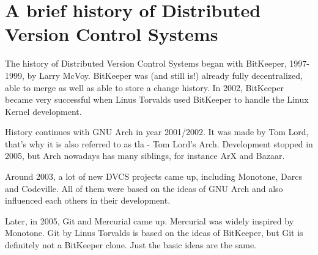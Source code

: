 \section {A brief history of Distributed Version Control Systems}

The history of Distributed Version Control Systems began with BitKeeper, 1997-1999, by Larry McVoy. BitKeeper was (and still is!) already fully decentralized, able to merge as well as able to store a change history. In 2002, BitKeeper became very successful when Linus Torvalds used BitKeeper to handle the Linux Kernel development.

History continues with GNU Arch in year 2001/2002. It was made by Tom Lord, that's why it is also referred to as tla - Tom Lord's Arch. Development stopped in 2005, but Arch nowadays has many siblings, for instance ArX and Bazaar.

Around 2003, a lot of new DVCS projects came up, including Monotone, Darcs and Codeville. All of them were based on the ideas of GNU Arch and also influenced each others in their development.

Later, in 2005, Git and Mercurial came up. Mercurial was widely inspired by Monotone. Git by Linus Torvalds is based on the ideas of BitKeeper, but Git is definitely not a BitKeeper clone. Just the basic ideas are the same.
\cite{understandingvcs}
